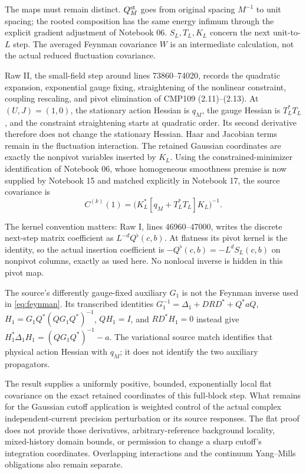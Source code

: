 \documentclass[11pt]{article}
\theoremstyle{remark}
\begin{document}
The maps must remain distinct. $Q_M^{\rm st}$ goes from original
spacing $M^{-1}$ to unit spacing; the rooted composition has the
same energy infimum through the explicit gradient adjustment of
Notebook 06. $S_L,T_L,K_L$ concern the next unit-to-$L$ step.
The averaged Feynman covariance $W$ is an intermediate calculation,
not the actual reduced fluctuation covariance.

Raw II, the small-field step around lines 73860--74020, records the
quadratic expansion, exponential gauge fixing, straightening of the
nonlinear constraint, coupling rescaling, and pivot elimination of
CMP109 (2.11)--(2.13). At $(U,J)=(1,0)$, the stationary action
Hessian is $q_M$, the gauge Hessian is $T_L^*T_L$, and the constraint
straightening starts at quadratic order. Its second derivative
therefore does not change the stationary Hessian. Haar and Jacobian
terms remain in the fluctuation interaction. The retained Gaussian
coordinates are exactly the nonpivot variables inserted by $K_L$.
Using the constrained-minimizer identification of Notebook 06,
whose homogeneous smoothness premise is now supplied by Notebook 15
and matched explicitly in Notebook 17, the source covariance is
\[
 C^{(k)}(1)=\bigl(K_L^*[q_M+T_L^*T_L]K_L\bigr)^{-1}.
\]

The kernel convention matters: Raw I, lines 46960--47000, writes
the discrete next-step matrix coefficient as $L^{-d}Q^\flat(c,b)$.
At flatness its pivot kernel is the identity, so the actual insertion
coefficient is $-Q^\flat(c,b)=-L^dS_L(c,b)$ on nonpivot columns,
exactly as used here. No nonlocal inverse is hidden in this pivot map.

The source's differently gauge-fixed auxiliary $G_1$ is not the
Feynman inverse used in \eqref{eq:feynman}. Its transcribed identities
$G_1^{-1}=\Delta_1+DRD^*+Q^*aQ$,
$H_1=G_1Q^*(QG_1Q^*)^{-1}$, $QH_1=I$, and $RD^*H_1=0$
instead give $H_1^*\Delta_1H_1=(QG_1Q^*)^{-1}-a$.
The variational source match identifies that physical action Hessian
with $q_M$; it does not identify the two auxiliary propagators.

The result supplies a uniformly positive, bounded, exponentially
local flat covariance on the exact retained coordinates of this
full-block step. What remains for the Gaussian cutoff application
is weighted control of the actual complex independent-current
precision perturbation or its source responses. The flat proof
does not provide those derivatives, arbitrary-reference background
locality, mixed-history domain bounds, or permission to change a
sharp cutoff's integration coordinates. Overlapping interactions
and the continuum Yang--Mills obligations also remain separate.
\end{document}
